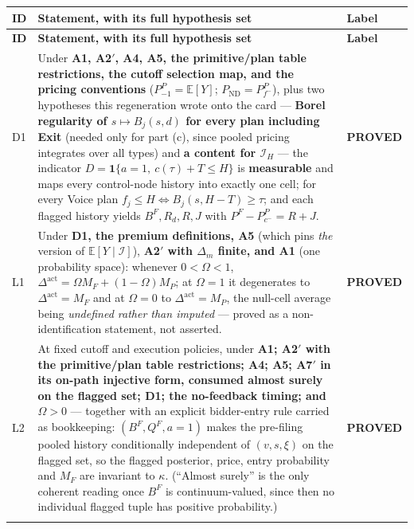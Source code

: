 \documentclass[11pt,a4paper]{article}
\newcommand{\Eop}{\mathbb{E}}
\newcommand{\ind}{\mathbf{1}}
\newcommand{\Dact}{\Delta^{\mathrm{act}}}
\newcommand{\ND}{\mathrm{ND}}
\begin{document}
\begingroup
\small
\setlength{\extrarowheight}{2pt}
\begin{longtable}{@{}p{}>{\raggedright\arraybackslash}p{}>{\raggedright\arraybackslash}p{}@{}}
\toprule
\textbf{ID} & \textbf{Statement, with its full hypothesis set} & \textbf{Label}\\
\midrule
\endfirsthead
\toprule
\textbf{ID} & \textbf{Statement, with its full hypothesis set} & \textbf{Label}\\
\midrule
\endhead
\bottomrule
\endfoot

D1 &
Under \textbf{A1, A2$'$, A4, A5, the primitive/plan table restrictions, the cutoff
selection map, and the pricing conventions} ($P_{-1}^P=\Eop[Y]$;
$P_{\ND}=P^P_{f^-}$), plus two hypotheses this regeneration wrote onto the card ---
\textbf{Borel regularity of $s\mapsto B_j(s,d)$ for every plan including Exit}
(needed only for part (c), since pooled pricing integrates over all types) and
\textbf{a content for $\mathcal I_H$} --- the indicator
$D=\ind\{a=1,\ c(\tau)+T\le H\}$ is \textbf{measurable} and maps every control-node
history into exactly one cell; for every Voice plan $f_j\le H\iff B_j(s,H-T)\ge\tau$;
and each flagged history yields $B^F,R_d,R,J$ with $P^F-P_{c^-}^P=R+J$. &
\textbf{PROVED} \\
\addlinespace

L1 &
Under \textbf{D1, the premium definitions, A5} (which pins \emph{the} version of
$\Eop[Y\mid\mathcal I]$), \textbf{A2$'$ with $\Delta_m$ finite, and A1} (one
probability space): whenever $0<\Omega<1$,
$\Dact=\Omega M_F+(1-\Omega)M_P$; at $\Omega=1$ it degenerates to $\Dact=M_F$ and at
$\Omega=0$ to $\Dact=M_P$, the null-cell average being \emph{undefined rather than
imputed} --- proved as a non-identification statement, not asserted. &
\textbf{PROVED} \\
\addlinespace

L2 &
At fixed cutoff and execution policies, under \textbf{A1; A2$'$ with the
primitive/plan table restrictions; A4; A5; A7$'$ in its on-path injective form,
consumed almost surely on the flagged set; D1; the no-feedback timing; and
$\Omega>0$} --- together with an explicit bidder-entry rule carried as bookkeeping:
$(B^F,Q^F,a{=}1)$ makes the pre-filing pooled history conditionally independent of
$(v,s,\xi)$ on the flagged set, so the flagged posterior, price, entry probability
and $M_F$ are invariant to $\kappa$. (``Almost surely'' is the only coherent reading
once $B^F$ is continuum-valued, since then no individual flagged tuple has positive
probability.) &
\textbf{PROVED} \\
\addlinespace


\end{longtable}
\end{document}
